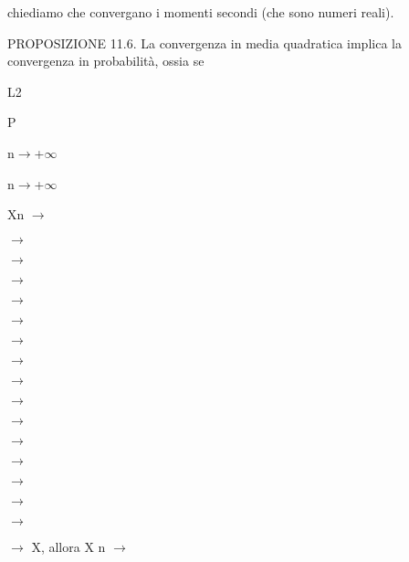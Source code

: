 \documentclass[a4paper,portrait,12pt]{article}
\begin{document}
\begin{flushleft}
chiediamo che convergano i momenti secondi (che sono numeri reali).
\end{flushleft}


\begin{flushleft}
PROPOSIZIONE 11.6. La convergenza in media quadratica implica la convergenza in probabilit\`{a}, ossia se
\end{flushleft}


\begin{flushleft}
L2
\end{flushleft}





\begin{flushleft}
P
\end{flushleft}





\begin{flushleft}
n$\rightarrow$+$\infty$
\end{flushleft}





\begin{flushleft}
n$\rightarrow$+$\infty$
\end{flushleft}





\begin{flushleft}
Xn $\rightarrow$
\end{flushleft}


$\rightarrow$


$\rightarrow$


$\rightarrow$


$\rightarrow$


$\rightarrow$


$\rightarrow$


$\rightarrow$


$\rightarrow$


$\rightarrow$


$\rightarrow$


$\rightarrow$


$\rightarrow$


$\rightarrow$


$\rightarrow$


$\rightarrow$


\begin{flushleft}
$\rightarrow$ X, allora X n $\rightarrow$
\end{flushleft}
\end{document}
